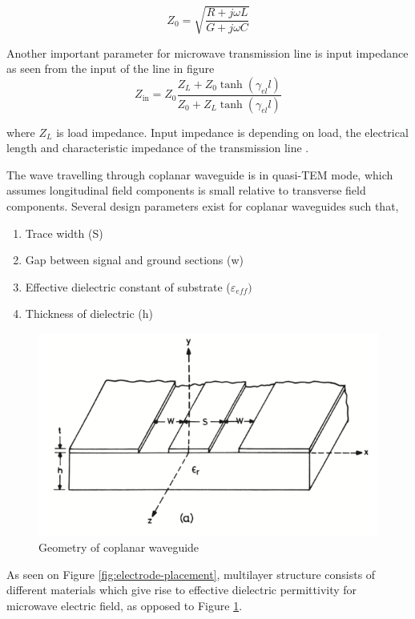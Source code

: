 \documentclass[thesis]{deutez}
\begin{document}
	\begin{equation}
		Z_0 = \sqrt{\frac{R+j\omega L}{G+j\omega C}}
		\label{eq:characteristic_impedance}	
	\end{equation}		

	

    Another important parameter for microwave transmission line is input impedance as seen from the input of the line in figure 
    \begin{equation}
        Z_\text{in} = Z_0 \frac{Z_L + Z_0 \tanh(\gamma_{el} l)}{Z_0 + Z_L \tanh(\gamma_{el} l)}
        \label{eq:input-impedance}
    \end{equation}

    where $Z_L$ is load impedance. Input impedance is depending on load, the electrical length and characteristic impedance of the transmission line .

    The wave travelling through coplanar waveguide is in quasi-TEM mode, which assumes longitudinal field components is small relative to transverse field components. Several design parameters exist for coplanar waveguides such that,
    
    \begin{enumerate}
        \item Trace width (S)
        \item Gap between signal and ground sections (w)
        \item Effective dielectric constant of substrate ($\varepsilon_{eff})$
        \item Thickness of dielectric (h)
    \end{enumerate} 

    \begin{figure}[h]
        \centering
        \includegraphics[width=0.6\linewidth]{cpw.png}
        \caption{Geometry of coplanar waveguide \cite{12}}
        \label{fig:cpw}
    \end{figure}
	
	As seen on Figure \ref{fig:electrode-placement}, multilayer structure consists of different materials which give rise to effective dielectric permittivity for microwave electric field, as opposed to Figure \ref{fig:cpw}.
	
\end{document}
